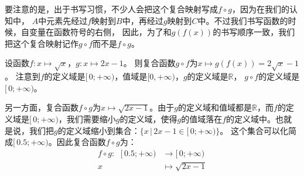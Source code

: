 \documentclass[12pt,UTF8]{ctexbook}
\begin{document}
要注意的是，出于书写习惯，不少人会把这个复合映射写成$f\circ g$，因为在我们的认知中，
$A$中元素先经过$f$映射到$B$中，再经过$g$映射到$C$中。不过我们书写函数的时候，自变量在函数符号的右侧，
因此，为了和$g(f(x))$的书写顺序一致，我们把这个复合映射记作$g\circ f$而不是$f\circ g$。

设函数$f:x\mapsto \sqrt{x}$，$g:x\mapsto 2x - 1$。
则复合函数$g\circ f$为$x\mapsto g(f(x)) = 2\sqrt{x} - 1$。
注意到$f$的定义域是$[\,0;+\infty)$，值域是$[0, +\infty)$，$g$的定义域是$\mathbb{R}$，
$g\circ f$的定义域是$[\,0; +\infty)$。

另一方面，复合函数$f\circ g$为$x\mapsto \sqrt{2x - 1}$。由于$g$的定义域和值域都是$\mathbb{R}$，而$f$的定义域是$[\,0; +\infty)$，我们需要缩小$g$的定义域，使得$g$的值域落在$f$的定义域中。也就是说，我们把$g$的定义域缩小到集合：$\{x \,|\, 2x - 1 \in [\,0;+\infty)\}$。
这个集合可以化简成$[\,0.5;+\infty)$。因此复合函数$f\circ g$为：
\begin{align*}
    f\circ g : \;\,\, [\,0.5; +\infty) &\rightarrow [\,0; +\infty)  \\
    x &\mapsto \sqrt{2x - 1} 
\end{align*}
\end{document}

